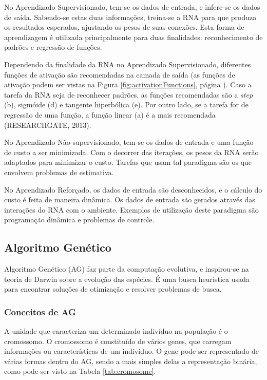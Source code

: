 \documentclass[12pt,a4paper]{article}
\begin{document}
	No Aprendizado Supervisionado,
	tem-se os dados de entrada, e infere-se os dados de saída.
	Sabendo-se estas duas informações, treina-se a RNA para que produza os resultados esperados,
	ajustando os pesos de suas conexões.
	Esta forma de aprendizagem é utilizada principalmente para duas finalidades:
	reconhecimento de padrões e regressão de funções.
	
	Dependendo da finalidade da RNA no Aprendizado Supervisionado,
	diferentes funções de ativação são recomendadas na camada de saída
	(as funções de ativação podem ser vistas na Figura \ref{fig:activationFunctions}, página \pageref{fig:activationFunctions}).
	Caso a tarefa da RNA seja de reconhecer padrões,
	as funções recomendadas são a \textit{step} (b), sigmóide (d) e tangente hiperbólica (e).
	Por outro lado, se a tarefa for de regressão de uma função,
	a função linear (a) é a mais recomendada (RESEARCHGATE, 2013).
	
	No Aprendizado Não-supervisionado,
	tem-se os dados de entrada e uma função de custo a ser minimizada.
	Com o decorrer das iterações,
	os pesos da RNA serão adaptados para minimizar o custo.
	Tarefas que usam tal paradigma são os que envolvem problemas de estimativa.
	
	No Aprendizado Reforçado,
	os dados de entrada são desconhecidos,
	e o cálculo do custo é feita de maneira dinâmica.
	Os dados de entrada são gerados através das interações do RNA com o ambiente.
	Exemplos de utilização deste paradigma são
	programação dinâmica e problemas de controle.

	\FloatBarrier
	\subsection{Algoritmo Genético}
	Algoritmo Genético (AG) faz parte da computação evolutiva,
	e inspirou-se na teoria de Darwin sobre a evolução das espécies.
	É uma busca heurística usada para encontrar soluções de otimização e resolver problemas de busca.
	
	\FloatBarrier
	\subsubsection{Conceitos de AG}
	A unidade que caracteriza um determinado indivíduo na população é o cromossomo.
	O cromossomo é constituído de vários genes,
	que carregam informações ou características de um indivíduo. %
	O gene pode ser representado de várias formas dentro do AG,
	sendo a mais simples delas a representação binária,
	como pode ser visto na Tabela \ref{tab:cromosome}.
	
\end{document}

